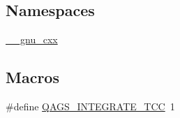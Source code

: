 \subsection*{Namespaces}
\begin{DoxyCompactItemize}
\item 
 \hyperlink{namespace____gnu__cxx}{\+\_\+\+\_\+gnu\+\_\+cxx}
\end{DoxyCompactItemize}
\subsection*{Macros}
\begin{DoxyCompactItemize}
\item 
\#define \hyperlink{qags__integrate_8tcc_afafa6b4ebd08aaff5160db53357e5529}{Q\+A\+G\+S\+\_\+\+I\+N\+T\+E\+G\+R\+A\+T\+E\+\_\+\+T\+CC}~1
\end{DoxyCompactItemize}
